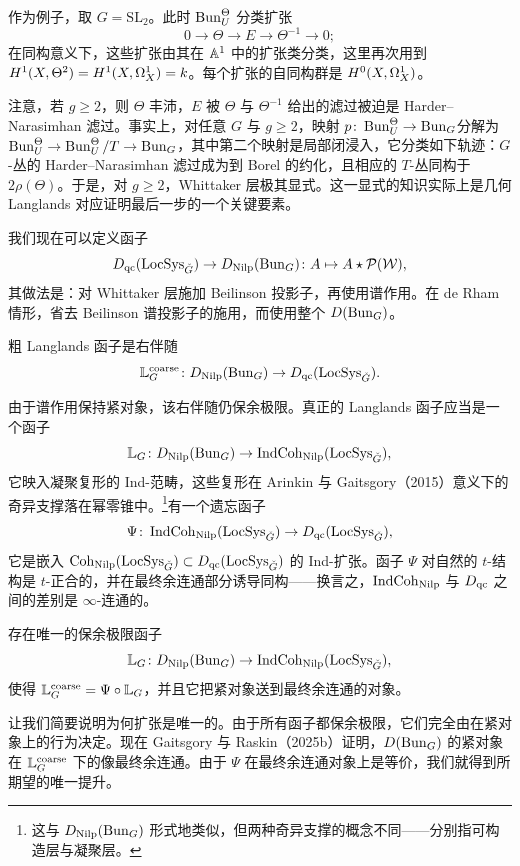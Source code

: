 作为例子，取 $G=\mathrm{SL}_2$。此时 $\operatorname{Bun}^{\Theta}_{U}$ 分类扩张
\[
0\to\Theta\to E\to\Theta^{-1}\to 0;
\]
在同构意义下，这些扩张由其在 $\mathbb{A}^{1}$ 中的扩张类分类，这里再次用到 $H^{1}(X,\Theta^{2})=H^{1}(X,\Omega^{1}_{X})=k$。每个扩张的自同构群是 $H^{0}(X,\Omega^{1}_{X})$。

注意，若 $g\ge 2$，则 $\Theta$ 丰沛，$E$ 被 $\Theta$ 与 $\Theta^{-1}$ 给出的滤过被迫是 Harder--Narasimhan 滤过。事实上，对任意 $G$ 与 $g\ge 2$，映射 $p\colon\operatorname{Bun}^{\Theta}_{U}\to\operatorname{Bun}_{G}$分解为 $\operatorname{Bun}^{\Theta}_{U}\to\operatorname{Bun}^{\Theta}_{U}/T\to\operatorname{Bun}_{G}$，其中第二个映射是局部闭浸入，它分类如下轨迹：$G$-丛的 Harder--Narasimhan 滤过成为到 Borel 的约化，且相应的 $T$-丛同构于 $2\rho(\Theta)$。于是，对 $g\ge 2$，Whittaker 层极其显式。这一显式的知识实际上是几何 Langlands 对应证明最后一步的一个关键要素。

我们现在可以定义函子
\[
D_{\mathrm{qc}}(\operatorname{LocSys}_{\check{G}})\to D_{\mathrm{Nilp}}(\operatorname{Bun}_G)\colon A\mapsto A\star\mathcal{P}(\mathcal{W}),
\]
其做法是：对 Whittaker 层施加 Beilinson 投影子，再使用谱作用。在 de Rham 情形，省去 Beilinson 谱投影子的施用，而使用整个 $D(\operatorname{Bun}_G)$。

\begin{definition}
粗 Langlands 函子是右伴随
\[
\mathbb{L}^{\mathrm{coarse}}_{G}\colon D_{\mathrm{Nilp}}(\operatorname{Bun}_G)\to D_{\mathrm{qc}}(\operatorname{LocSys}_{\check{G}}).
\]
\end{definition}

由于谱作用保持紧对象，该右伴随仍保余极限。真正的 Langlands 函子应当是一个函子
\[
\mathbb{L}_{G}\colon D_{\mathrm{Nilp}}(\operatorname{Bun}_G)\to\operatorname{IndCoh}_{\mathrm{Nilp}}(\operatorname{LocSys}_{\check{G}}),
\]
它映入凝聚复形的 Ind-范畴，这些复形在 Arinkin 与 Gaitsgory（2015）意义下的奇异支撑落在幂零锥中。\footnote{这与 $D_{\mathrm{Nilp}}(\operatorname{Bun}_G)$ 形式地类似，但两种奇异支撑的概念不同——分别指可构造层与凝聚层。}有一个遗忘函子
\[
\Psi\colon \operatorname{IndCoh}_{\mathrm{Nilp}}(\operatorname{LocSys}_{\check{G}})\to D_{\mathrm{qc}}(\operatorname{LocSys}_{\check{G}}),
\]
它是嵌入 $\operatorname{Coh}_{\mathrm{Nilp}}(\operatorname{LocSys}_{\check{G}})\subset D_{\mathrm{qc}}(\operatorname{LocSys}_{\check{G}})$ 的 Ind-扩张。函子 $\Psi$ 对自然的 $t$-结构是 $t$-正合的，并在最终余连通部分诱导同构——换言之，$\operatorname{IndCoh}_{\mathrm{Nilp}}$ 与 $D_{\mathrm{qc}}$ 之间的差别是 $\infty$-连通的。

\begin{theorem}
存在唯一的保余极限函子
\[
\mathbb{L}_{G}\colon D_{\mathrm{Nilp}}(\operatorname{Bun}_G)\to\operatorname{IndCoh}_{\mathrm{Nilp}}(\operatorname{LocSys}_{\check{G}}),
\]
使得 $\mathbb{L}^{\mathrm{coarse}}_{G}=\Psi\circ\mathbb{L}_{G}$，并且它把紧对象送到最终余连通的对象。
\end{theorem}

\begin{remark}
让我们简要说明为何扩张是唯一的。由于所有函子都保余极限，它们完全由在紧对象上的行为决定。现在 Gaitsgory 与 Raskin（2025b）证明，$D(\operatorname{Bun}_G)$ 的紧对象在 $\mathbb{L}^{\mathrm{coarse}}_{G}$ 下的像最终余连通。由于 $\Psi$ 在最终余连通对象上是等价，我们就得到所期望的唯一提升。
\end{remark}

